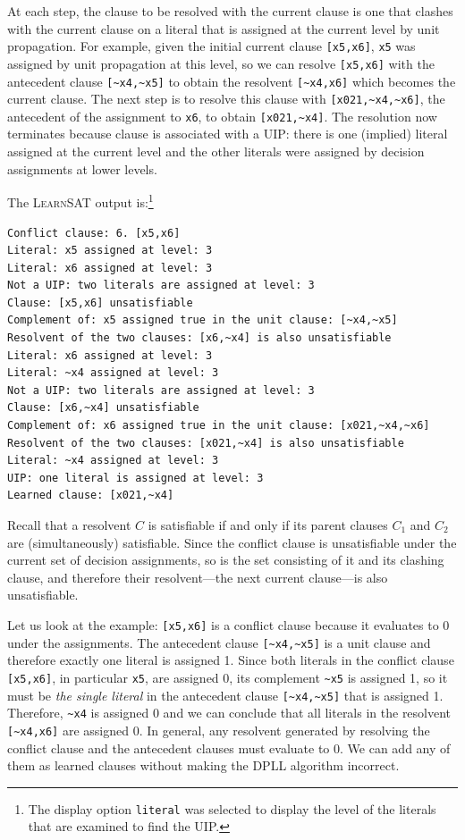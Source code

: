 \documentclass[11pt]{article}
\newcommand*{\p}[1]{\textup{\texttt{#1}}}
\newcommand*{\ls}{\textsc{LearnSAT}}
\begin{document}
At each step, the clause to be resolved with the current clause is one
that clashes with the current clause on a literal that is assigned at
the current level by unit propagation. For example, given the initial
current clause \verb+[x5,x6]+, \p{x5} was assigned by unit propagation
at this level, so we can resolve \verb+[x5,x6]+ with the antecedent
clause \verb+[~x4,~x5]+ to obtain the resolvent \verb+[~x4,x6]+ which
becomes the current clause. The next step is to resolve this clause with
\verb+[x021,~x4,~x6]+, the antecedent of the assignment to \p{x6}, to
obtain \verb+[x021,~x4]+. The resolution now terminates because clause
is associated with a UIP: there is one (implied) literal assigned at the
current level and the other literals were assigned by decision
assignments at lower levels.

The \ls{} output is:\footnote{The display option \p{literal} was
selected to display the level of the literals that are examined to find
the UIP.}

\begin{verbatim}
Conflict clause: 6. [x5,x6]
Literal: x5 assigned at level: 3
Literal: x6 assigned at level: 3
Not a UIP: two literals are assigned at level: 3
Clause: [x5,x6] unsatisfiable
Complement of: x5 assigned true in the unit clause: [~x4,~x5]
Resolvent of the two clauses: [x6,~x4] is also unsatisfiable
Literal: x6 assigned at level: 3
Literal: ~x4 assigned at level: 3
Not a UIP: two literals are assigned at level: 3
Clause: [x6,~x4] unsatisfiable
Complement of: x6 assigned true in the unit clause: [x021,~x4,~x6]
Resolvent of the two clauses: [x021,~x4] is also unsatisfiable
Literal: ~x4 assigned at level: 3
UIP: one literal is assigned at level: 3
Learned clause: [x021,~x4]
\end{verbatim}

Recall \cite[Theorem~4.17]{mlcs} that a resolvent $C$ is satisfiable if
and only if its parent clauses $C_1$ and $C_2$ are (simultaneously)
satisfiable. Since the conflict clause is unsatisfiable under the
current set of decision assignments, so is the set consisting of it and
its clashing clause, and therefore their resolvent---the next current
clause---is also unsatisfiable.

Let us look at the example: \verb+[x5,x6]+ is a conflict clause because
it evaluates to 0 under the assignments. The antecedent clause
\verb+[~x4,~x5]+ is a unit clause and therefore exactly one literal is
assigned 1. Since both literals in the conflict clause \verb+[x5,x6]+,
in particular \verb+x5+, are assigned 0, its complement \verb+~x5+ is
assigned 1, so it must be \emph{the single literal} in the antecedent
clause \verb+[~x4,~x5]+ that is assigned 1. Therefore, \verb+~x4+ is
assigned 0 and we can conclude that all literals in the resolvent
\verb+[~x4,x6]+ are assigned 0. In general, any resolvent generated by
resolving the conflict clause and the antecedent clauses must evaluate
to 0. We can add any of them as learned clauses without making the DPLL
algorithm incorrect.
\end{document}
